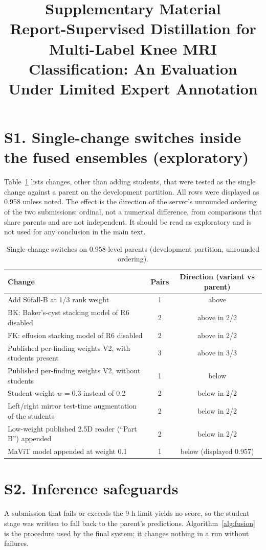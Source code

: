 \documentclass[10pt]{article}
\title{Supplementary Material\\[4pt]\large Report-Supervised Distillation for Multi-Label Knee MRI Classification:
An Evaluation Under Limited Expert Annotation}
\date{}
\begin{document}
\maketitle

\section*{S1. Single-change switches inside the fused ensembles (exploratory)}
Table~\ref{tab:switches} lists changes, other than adding students, that were tested as the single change against a
parent on the development partition. All rows were displayed as 0.958 unless noted. The effect is the direction of the
server's unrounded ordering of the two submissions: ordinal, not a numerical difference, from comparisons that share
parents and are not independent. It should be read as exploratory and is not used for any conclusion in the main text.

\begin{table}[h]
\centering
\caption{Single-change switches on 0.958-level parents (development partition, unrounded ordering).}
\label{tab:switches}
\begin{tabular}{p{8.5cm}cc}
\toprule
Change & Pairs & Direction (variant vs parent)\\
\midrule
Add S6fall-B at 1/3 rank weight & 1 & above\\
BK: Baker's-cyst stacking model of R6 disabled & 2 & above in 2/2\\
FK: effusion stacking model of R6 disabled & 2 & above in 2/2\\
Published per-finding weights V2, with students present & 3 & above in 3/3\\
Published per-finding weights V2, without students & 1 & below\\
Student weight $w=0.3$ instead of 0.2 & 2 & below in 2/2\\
Left/right mirror test-time augmentation of the students & 2 & below in 2/2\\
Low-weight published 2.5D reader (``Part B'') appended & 2 & below in 2/2\\
MaViT model appended at weight 0.1 & 1 & below (displayed 0.957)\\
\bottomrule
\end{tabular}
\end{table}

\section*{S2. Inference safeguards}
A submission that fails or exceeds the 9-h limit yields no score, so the student stage was written to fall back to the
parent's predictions. Algorithm~\ref{alg:fusion} is the procedure used by the final system; it changes nothing in a run
without failures.
\end{document}

